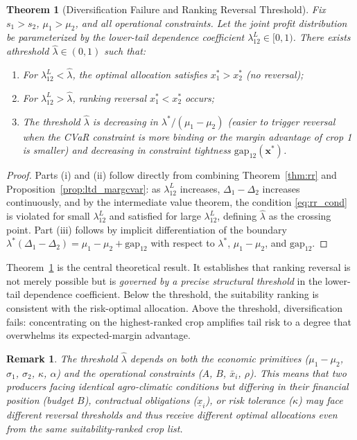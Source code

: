 \documentclass[12pt,review,authoryear]{elsarticle}
\numberwithin{equation}{section}
\newtheorem{theorem}{Theorem}[section]
\newtheorem{remark}{Remark}[section]
\begin{document}
\begin{theorem}[Diversification Failure and Ranking Reversal Threshold]
\label{thm:div_failure}
Fix $s_1 > s_2$, $\mu_1 > \mu_2$, and all operational constraints.  Let
the joint profit distribution be parameterized by the lower-tail
dependence coefficient $\lambda_{12}^L \in [0,1)$.  There exists athreshold $\hat{\lambda} \in (0,1)$ such that:\begin{enumerate}\item[(i)] For $\lambda_{12}^L < \hat{\lambda}$, the optimal allocation
satisfies $x_1^* > x_2^*$ (no reversal);
\item[(ii)] For $\lambda_{12}^L > \hat{\lambda}$, ranking reversal
$x_1^* < x_2^*$ occurs;
\item[(iii)] The threshold $\hat{\lambda}$ is decreasing in
$\lambda^* / (\mu_1 - \mu_2)$ (easier to trigger reversal when the CVaR
constraint is more binding or the margin advantage of crop 1 is smaller)
and decreasing in constraint tightness $\text{gap}_{12}(\mathbf{x}^*)$.
\end{enumerate}
\end{theorem}

\begin{proof}
Parts (i) and (ii) follow directly from combining Theorem~\ref{thm:rr}
and Proposition~\ref{prop:ltd_margcvar}: as $\lambda_{12}^L$ increases,
$\Delta_1 - \Delta_2$ increases continuously, and by the intermediate
value theorem, the condition \eqref{eq:rr_cond} is violated for small
$\lambda_{12}^L$ and satisfied for large $\lambda_{12}^L$, defining
$\hat{\lambda}$ as the crossing point.  Part (iii) follows by
implicit differentiation of the boundary $\lambda^*(\Delta_1 - \Delta_2)
= \mu_1 - \mu_2 + \text{gap}_{12}$ with respect to $\lambda^*$, $\mu_1 -
\mu_2$, and $\text{gap}_{12}$.
\end{proof}

Theorem~\ref{thm:div_failure} is the central theoretical result.  It
establishes that ranking reversal is not merely possible but is
\emph{governed by a precise structural threshold} in the lower-tail
dependence coefficient.  Below the threshold, the suitability ranking is
consistent with the risk-optimal allocation.  Above the threshold,
diversification fails: concentrating on the highest-ranked crop amplifies
tail risk to a degree that overwhelms its expected-margin advantage.

\begin{remark}
The threshold $\hat{\lambda}$ depends on both the economic primitives
($\mu_1 - \mu_2$, $\sigma_1$, $\sigma_2$, $\kappa$, $\alpha$) and the
operational constraints ($A$, $B$, $\bar{x}_i$, $\rho$).  This means
that two producers facing identical agro-climatic conditions but
differing in their financial position (budget $B$), contractual
obligations ($\underline{x}_i$), or risk tolerance ($\kappa$) may
face different reversal thresholds and thus receive different optimal
allocations even from the same suitability-ranked crop list.
\end{remark}
\end{document}
